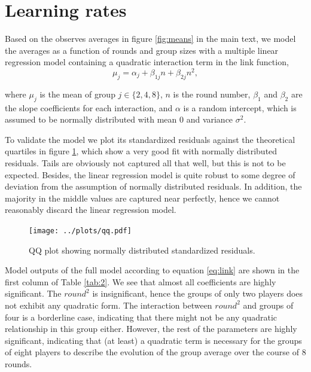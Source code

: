 \section{Learning rates}
\noindent
Based on the observes averages in figure \ref{fig:means} in the main text, we model the averages as a function of rounds and group sizes with a multiple linear regression model containing a quadratic interaction term in the link function, 
\begin{equation}
\mu_{j} =  \alpha_j + \beta_{1j}n + \beta_{2j}n^2 ,
\label{eq:link}
\end{equation}

\noindent
where $\mu_{j}$ is the mean of group $j \in \{2,4,8\}$, $n$ is the round number, $\beta_{1}$ and  $\beta_{2}$ are the slope coefficients for each interaction, and $\alpha$ is a random intercept, which is assumed to be normally distributed with mean $0$ and variance $\sigma^2$. 

To validate the model we plot its standardized residuals against the theoretical quartiles in figure \ref{fig:qq}, which show a very good fit with normally distributed residuals. Tails are obviously not captured all that well, but this is not to be expected. Besides, the linear regression model is quite robust to some degree of deviation from the assumption of normally distributed residuals. In addition, the majority in the middle values are captured near perfectly, hence we cannot reasonably discard the linear regression model.

\begin{figure}[t]
\begin{center}
\texttt{[image: ../plots/qq.pdf]}\caption{QQ plot showing normally distributed standardized residuals.}
\label{fig:qq}
\end{center}
\end{figure}

Model outputs of the full model according to equation \eqref{eq:link} are shown in the first column of Table \ref{tab:2}. We see that almost all coefficients are highly significant. The $round^2$ is insignificant, hence the groups of only two players does not exhibit any quadratic form. The interaction between $round^2$ and groups of four is a borderline case, indicating that there might not be any quadratic relationship in this group either. However, the rest of the parameters are highly significant, indicating that (at least) a quadratic term is necessary for the groups of eight players to describe the evolution of the group average over the course of 8 rounds.

